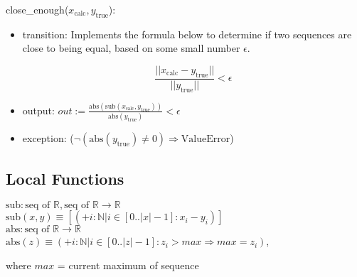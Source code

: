 \documentclass[12pt]{article}
\begin{document}
\begin{enumerate}[a)]
\noindent close\_enough($x_\text{calc}, y_\text{true}$):
\begin{itemize}
\item transition: Implements the formula below to determine if two sequences are close to 
being equal, based on some small number $\epsilon$.

\begin{equation}
\frac{|| x_\text{calc} - y_\text{true} ||} {||y_\text{true}||} < \epsilon \label{Eq_calcError}
\end{equation} 

\item output: $out := \frac{\text{abs}(\text{sub}(x_\text{calc}, y_\text{true}))} 
{\text{abs}(y_\text{true})} < \epsilon $
\item exception: ($\neg (\text{abs}(y_\text{true}) \neq 0) \Rightarrow \text{ValueError}$)
\end{itemize}

\subsection*{Local Functions}

\noindent $\text{sub}: \text{seq of } \mathbb{R}, \text{seq of } \mathbb{R} \rightarrow 
\mathbb{R}$\\
\noindent $\text{sub}(x, y) \equiv [(+ i: \mathbb{N} | i \in [0..|x|-1] :
x_i - y_i)]$\\

\noindent $\text{abs}: \text{seq of } \mathbb{R} \rightarrow \mathbb{R}$\\
\noindent $\text{abs}(z) \equiv (+ i: \mathbb{N} | i \in [0..|z|-1] :
z_i > max \Rightarrow max = z_i)$,

where $max$ = current maximum of sequence

\newpage


\end{enumerate}
\end{document}
